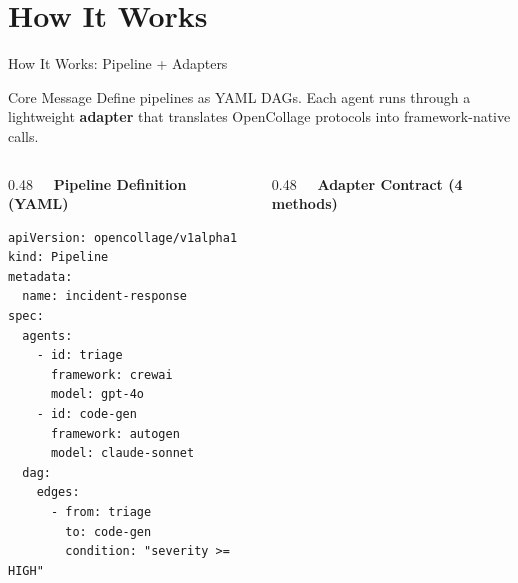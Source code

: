 \section{How It Works}

\begin{frame}[fragile]{How It Works: Pipeline + Adapters}
  \vspace{-0.2cm}
  \scriptsize
  \begin{block}{Core Message}
    \scriptsize
    Define pipelines as YAML DAGs. Each agent runs through a lightweight
    \textbf{adapter} that translates OpenCollage protocols into framework-native calls.
  \end{block}

  \vspace{0.1cm}

  \begin{columns}[T]
    \begin{column}{0.48\textwidth}
      \textbf{\ \ Pipeline Definition (YAML)}
      \vspace{0.1cm}
      \begin{lstlisting}
apiVersion: opencollage/v1alpha1
kind: Pipeline
metadata:
  name: incident-response
spec:
  agents:
    - id: triage
      framework: crewai
      model: gpt-4o
    - id: code-gen
      framework: autogen
      model: claude-sonnet
  dag:
    edges:
      - from: triage
        to: code-gen
        condition: "severity >= HIGH"
      \end{lstlisting}
    \end{column}
    \begin{column}{0.48\textwidth}
      \textbf{\ \ Adapter Contract (4 methods)}
      \vspace{0.2cm}

      \begin{center}
      \end{center}


\end{column}
\end{columns}
\end{frame}
